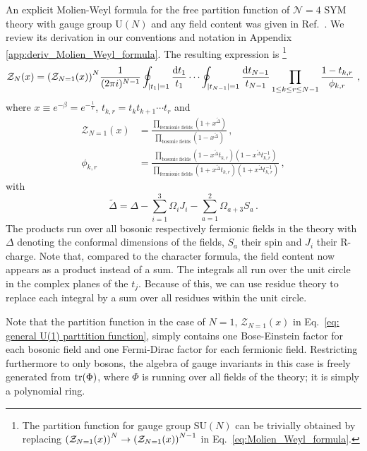 \documentclass[a4paper,11pt]{article}
\begin{document}
An explicit Molien-Weyl formula for the free partition function of $\mathcal{N}=4$ SYM theory with gauge group $\text{U}(N)$ and any field content was given in Ref.\ \cite{Dolan:2007rq}. We review its derivation in our conventions and notation in Appendix \ref{app:deriv_Molien_Weyl_formula}.
% 
The resulting expression is%
\footnote{The partition function for gauge group $\text{SU}(N)$ can be trivially obtained by replacing $\qty(\mathcal{Z}_{N=1}(x))^N\to\qty(\mathcal{Z}_{N=1}(x))^{N-1}$ in Eq.\ \eqref{eq:Molien_Weyl_formula}.}
\begin{equation} \label{eq:Molien_Weyl_formula}
	\mathcal{Z}_N(x) = \qty(\mathcal{Z}_{N=1}(x))^N \frac{1}{(2\pi i)^{N-1}} \oint_{|t_1|=1} \frac{\dd t_1}{t_1} \cdots \oint_{|t_{N-1}|=1} \frac{\dd t_{N-1}}{t_{N-1}} 
	\prod_{1\leq k\leq r \leq N-1}  \frac{1-t_{k,r}}{\phi_{k,r}} \ ,
\end{equation}
where $x\equiv e^{-\beta}= e^{-\frac{1}{T}}$, $t_{k,r}=t_k t_{k+1}\cdots t_r$ and
% 
\begin{align}
\label{eq: general U(1) parttition function}
	\mathcal{Z}_{N=1}(x) &= \frac{\prod_{\text{fermionic fields}} (1+x^{\tilde{\Delta}})}{\prod_{\text{bosonic fields}} (1-x^{\tilde{\Delta}})} \, ,
\\
	\phi_{k,r} &= \frac{\prod_{\text{bosonic fields}} (1-x^{\tilde{\Delta}}t_{k,r})(1-x^{\tilde{\Delta}}t_{k,r}^{-1})}{\prod_{\text{fermionic fields}} (1+x^{\tilde{\Delta}}t_{k,r})(1+x^{\tilde{\Delta}}t_{k,r}^{-1})} \, ,
\end{align}
with
\begin{equation}
 \tilde{\Delta}=\Delta -\sum_{i=1}^3 \Omega_i J_i - \sum_{a=1}^2 \Omega_{a+3} S_a\,.
\end{equation}
% 
The products run over all bosonic respectively fermionic fields in the theory with $\Delta$ denoting the conformal dimensions of the fields, $S_a$ their spin and $J_i$ their R-charge.
Note that, compared to the character formula, the field content now appears as a product instead of a sum.
% 
The integrals all run over the unit circle in the complex planes of the $t_j$. Because of this, we can use residue theory to replace each integral by a sum over all residues within the unit circle.

Note that the partition function in the case of $N=1$, $\mathcal{Z}_{N=1}(x)$ in Eq.\ \eqref{eq: general U(1) parttition function}, simply contains one Bose-Einstein factor for each bosonic field and one Fermi-Dirac factor for each fermionic field. 
Restricting furthermore to only bosons, the algebra of gauge invariants in this case is freely generated from $\tr(\Phi)$, where $\Phi$ is running over all fields of the theory; it is simply a polynomial ring.
\end{document}
